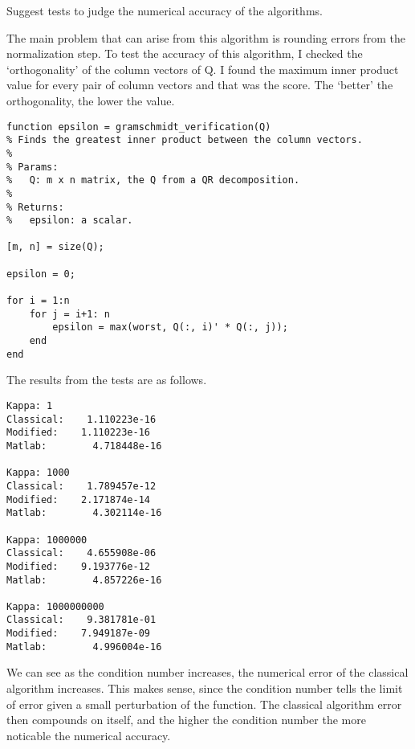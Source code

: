 \documentclass[12pt]{article}
\newenvironment{exercise}[2][Exercise]{\begin{trivlist}
\item[\hskip \labelsep{\bfseries #1}\hskip \labelsep{\bfseries #2.}]}{\end{trivlist}}
\begin{document}
\begin{exercise}{3} Suggest tests to judge the numerical accuracy of the algorithms.

    \noindent The main problem that can arise from this algorithm is rounding errors from the normalization step. 
    To test the accuracy of this algorithm, I checked the `orthogonality' of the column vectors of Q. 
    I found the maximum inner product value for every pair of column vectors and that was the score.
    The `better' the orthogonality, the lower the value.

    \begin{verbatim}
function epsilon = gramschmidt_verification(Q)
% Finds the greatest inner product between the column vectors.
%
% Params:
%   Q: m x n matrix, the Q from a QR decomposition.
%
% Returns:
%   epsilon: a scalar.

[m, n] = size(Q);

epsilon = 0;

for i = 1:n
    for j = i+1: n
        epsilon = max(worst, Q(:, i)' * Q(:, j));
    end
end
    \end{verbatim}

    \noindent The results from the tests are as follows.

    \begin{verbatim}
Kappa: 1
Classical:    1.110223e-16
Modified:    1.110223e-16
Matlab:        4.718448e-16

Kappa: 1000
Classical:    1.789457e-12
Modified:    2.171874e-14
Matlab:        4.302114e-16

Kappa: 1000000
Classical:    4.655908e-06
Modified:    9.193776e-12
Matlab:        4.857226e-16

Kappa: 1000000000
Classical:    9.381781e-01
Modified:    7.949187e-09
Matlab:        4.996004e-16
    \end{verbatim}

    \noindent We can see as the condition number increases, the numerical error of the classical algorithm increases.
    This makes sense, since the condition number tells the limit of error given a small perturbation of the function.
    The classical algorithm error then compounds on itself, and the higher the condition number the more noticable the numerical accuracy.

\end{exercise}
\end{document}
